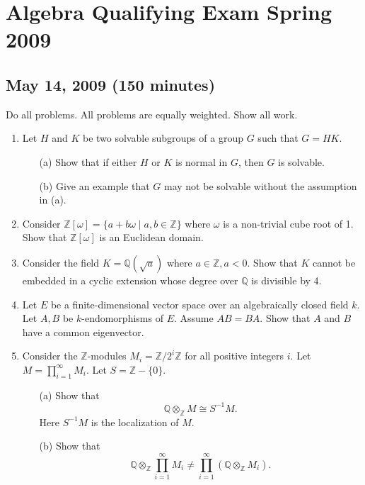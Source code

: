 \documentclass{article}
\begin{document}
\section*{Algebra Qualifying Exam Spring 2009}
\subsection*{May 14, 2009 (150 minutes)}

Do all problems. All problems are equally weighted. Show all work.

\begin{enumerate}
    \item Let \(H\) and \(K\) be two solvable subgroups of a group \(G\) such that \(G = HK\).
    \begin{itemize}
        \item[(a)] Show that if either \(H\) or \(K\) is normal in \(G\), then \(G\) is solvable.
        \item[(b)] Give an example that \(G\) may not be solvable without the assumption in (a).
    \end{itemize}

    \item Consider \(\mathbb{Z}[\omega] = \{a + b\omega \mid a, b \in \mathbb{Z}\}\) where \(\omega\) is a non-trivial cube root of 1. Show that \(\mathbb{Z}[\omega]\) is an Euclidean domain.

    \item Consider the field \(K = \mathbb{Q}(\sqrt{a})\) where \(a \in \mathbb{Z}, a < 0\). Show that \(K\) cannot be embedded in a cyclic extension whose degree over \(\mathbb{Q}\) is divisible by 4.

    \item Let \(E\) be a finite-dimensional vector space over an algebraically closed field \(k\). Let \(A, B\) be \(k\)-endomorphisms of \(E\). Assume \(AB = BA\). Show that \(A\) and \(B\) have a common eigenvector.

    \item Consider the \(\mathbb{Z}\)-modules \(M_i = \mathbb{Z}/2^i\mathbb{Z}\) for all positive integers \(i\). Let \(M = \prod_{i=1}^{\infty} M_i\). Let \(S = \mathbb{Z} - \{0\}\).
    \begin{itemize}
        \item[(a)] Show that
        \[\mathbb{Q} \otimes_{\mathbb{Z}} M \cong S^{-1}M.\]
        Here \(S^{-1}M\) is the localization of \(M\).
        \item[(b)] Show that
        \[\mathbb{Q} \otimes_{\mathbb{Z}} \prod_{i=1}^{\infty} M_i \neq \prod_{i=1}^{\infty} (\mathbb{Q} \otimes_{\mathbb{Z}} M_i).\]
    \end{itemize}


\end{enumerate}
\end{document}
